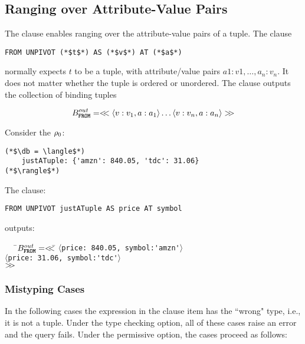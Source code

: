 \subsection{Ranging over Attribute-Value Pairs}
\label{sec:unpivot}

The  clause enables ranging over the attribute-value pairs of a
tuple. The \from clause

\begin{lstlisting}
FROM UNPIVOT (*$t$*) AS (*$v$*) AT (*$a$*)
\end{lstlisting}

\noindent normally expects $t$ to be a tuple, with attribute/value pairs
$a1: v1, \ldots, a_n:v_n$. It does not matter whether the tuple is ordered
or unordered. The \from clause outputs the collection of binding tuples 

\[
    B^{out}_{\texttt{\textbf{FROM}}} = <\!\!<
        \langle v:v_1, a:a_1 \rangle 
        \ldots
        \langle v:v_n, a:a_n\rangle
    >\!\!> 
\]

\begin{example}
Consider the $\rho_{0}$:

\begin{lstlisting}
(*$\db = \langle$*)
    justATuple: {'amzn': 840.05, 'tdc': 31.06}
(*$\rangle$*)
\end{lstlisting}

\noindent The \from clause:

\begin{lstlisting}
FROM UNPIVOT justATuple AS price AT symbol
\end{lstlisting}

\noindent outputs:

\begin{tabbing}
\ \ \ \=$B^{out}_{\texttt{\textbf{FROM}}} = <\!\!< $\=
    $\langle $\lstinline|price: 840.05, symbol:'amzn'|$ \rangle$\\
\>\>$\langle $\lstinline|price: 31.06, symbol:'tdc'|$ \rangle$\\
\>\>$>\!\!>$
\end{tabbing}
\end{example}

\subsubsection{Mistyping Cases}
\label{sec:unpivot-mistypings}

In the following cases the expression in the \from \unpivot clause item has the
``wrong" type, i.e., it is not a tuple. Under the type checking option, all of these cases raise an error
and the query fails. Under the permissive option, the cases proceed as follows:

